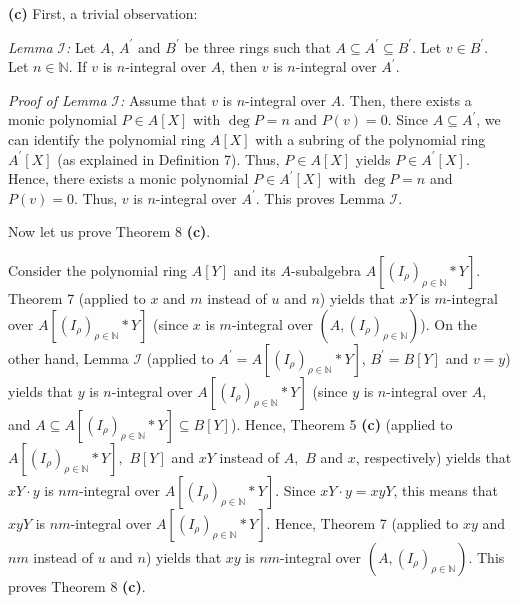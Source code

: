 \documentclass[12pt,final,notitlepage,onecolumn]{article}%
\begin{document}
\textbf{(c)} First, a trivial observation:

\textit{Lemma }$\mathcal{I}$\textit{:} Let $A$, $A^{\prime}$ and $B^{\prime}$
be three rings such that $A\subseteq A^{\prime}\subseteq B^{\prime}$. Let
$v\in B^{\prime}$. Let $n\in\mathbb{N}$. If $v$ is $n$-integral over $A$, then
$v$ is $n$-integral over $A^{\prime}$.

\textit{Proof of Lemma }$\mathcal{I}$\textit{:} Assume that $v$ is
$n$-integral over $A$. Then, there exists a monic polynomial $P\in A\left[
X\right]  $ with $\deg P=n$ and $P\left(  v\right)  =0$. Since $A\subseteq
A^{\prime}$, we can identify the polynomial ring $A\left[  X\right]  $ with a
subring of the polynomial ring $A^{\prime}\left[  X\right]  $ (as explained in
Definition 7). Thus, $P\in A\left[  X\right]  $ yields $P\in A^{\prime}\left[
X\right]  $. Hence, there exists a monic polynomial $P\in A^{\prime}\left[
X\right]  $ with $\deg P=n$ and $P\left(  v\right)  =0$. Thus, $v$ is
$n$-integral over $A^{\prime}$. This proves Lemma $\mathcal{I}$.

Now let us prove Theorem 8 \textbf{(c)}.

Consider the polynomial ring $A\left[  Y\right]  $ and its $A$-subalgebra
$A\left[  \left(  I_{\rho}\right)  _{\rho\in\mathbb{N}}\ast Y\right]  $.
Theorem 7 (applied to $x$ and $m$ instead of $u$ and $n$) yields that $xY$ is
$m$-integral over $A\left[  \left(  I_{\rho}\right)  _{\rho\in\mathbb{N}}\ast
Y\right]  $ (since $x$ is $m$-integral over $\left(  A,\left(  I_{\rho
}\right)  _{\rho\in\mathbb{N}}\right)  $). On the other hand, Lemma
$\mathcal{I}$ (applied to $A^{\prime}=A\left[  \left(  I_{\rho}\right)
_{\rho\in\mathbb{N}}\ast Y\right]  $, $B^{\prime}=B\left[  Y\right]  $ and
$v=y$) yields that $y$ is $n$-integral over $A\left[  \left(  I_{\rho}\right)
_{\rho\in\mathbb{N}}\ast Y\right]  $ (since $y$ is $n$-integral over $A$, and
$A\subseteq A\left[  \left(  I_{\rho}\right)  _{\rho\in\mathbb{N}}\ast
Y\right]  \subseteq B\left[  Y\right]  $). Hence, Theorem 5 \textbf{(c)}
(applied to $A\left[  \left(  I_{\rho}\right)  _{\rho\in\mathbb{N}}\ast
Y\right]  ,$ $B\left[  Y\right]  $ and $xY$ instead of $A,$ $B$ and $x$,
respectively) yields that $xY\cdot y$ is $nm$-integral over $A\left[  \left(
I_{\rho}\right)  _{\rho\in\mathbb{N}}\ast Y\right]  $. Since $xY\cdot y=xyY$,
this means that $xyY$ is $nm$-integral over $A\left[  \left(  I_{\rho}\right)
_{\rho\in\mathbb{N}}\ast Y\right]  $. Hence, Theorem 7 (applied to $xy$ and
$nm$ instead of $u$ and $n$) yields that $xy$ is $nm$-integral over $\left(
A,\left(  I_{\rho}\right)  _{\rho\in\mathbb{N}}\right)  $. This proves Theorem
8 \textbf{(c)}.
\end{document}
